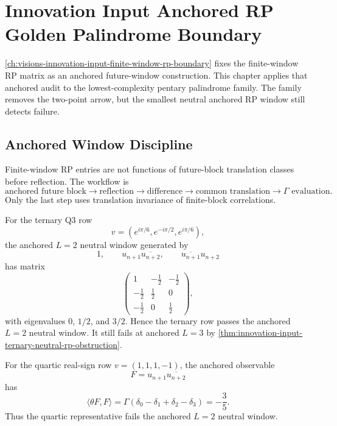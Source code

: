 \chapter{Innovation Input Anchored RP Golden Palindrome Boundary}
\label{ch:visions-innovation-input-anchored-rp-golden-palindrome-boundary}

\autoref{ch:visions-innovation-input-finite-window-rp-boundary} fixes the
finite-window RP matrix as an anchored future-window construction. This
chapter applies that anchored audit to the lowest-complexity pentary
palindrome family. The family removes the two-point arrow, but the
smallest neutral anchored RP window still detects failure.

\section{Anchored Window Discipline}
\label{sec:innovation-input-anchored-window-discipline}

\begin{principle}
\label{prin:innovation-input-anchored-rp-workflow}
Finite-window RP entries are not functions of future-block translation
classes before reflection. The workflow is
$$
\text{anchored future block}
\to
\text{reflection}
\to
\text{difference}
\to
\text{common translation}
\to
\Gamma\text{ evaluation}.
$$
Only the last step uses translation invariance of finite-block
correlations.
\end{principle}

\begin{principle}
\label{prin:innovation-input-ternary-anchored-status}
For the ternary Q3 row
$$
v=(e^{i\pi/6},e^{-i\pi/2},e^{i\pi/6}),
$$
the anchored $L=2$ neutral window generated by
$$
1,\qquad
u_{n+1}\overline{u_{n+2}},
\qquad
\overline{u_{n+1}}u_{n+2}
$$
has matrix
$$
\left(
\begin{array}{ccc}
1 & -\frac12 & -\frac12\\
-\frac12 & \frac12 & 0\\
-\frac12 & 0 & \frac12
\end{array}
\right),
$$
with eigenvalues $0$, $1/2$, and $3/2$. Hence the ternary row passes the
anchored $L=2$ neutral window. It still fails at anchored $L=3$ by
\autoref{thm:innovation-input-ternary-neutral-rp-obstruction}.
\end{principle}

\begin{principle}
\label{prin:innovation-input-quartic-anchored-status}
For the quartic real-sign row $v=(1,1,1,-1)$, the anchored observable
$$
F=u_{n+1}\overline{u_{n+2}}
$$
has
$$
\langle\theta F,F\rangle
=
\Gamma(\delta_0-\delta_1+\delta_2-\delta_3)
=
-\frac35.
$$
Thus the quartic representative fails the anchored $L=2$ neutral window.
\end{principle}

